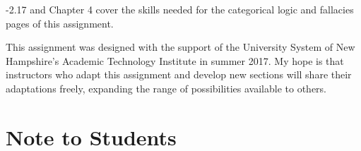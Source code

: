 \documentclass[oneside, openany]{book} %
\begin{document}
-2.17 and Chapter 4 cover the skills needed for the categorical logic and fallacies pages of this assignment.
 
This assignment was designed with  the support of the University System of New  Hampshire's Academic Technology Institute in summer 2017.  My hope  is that  instructors who  adapt this assignment and develop new sections will share their adaptations freely, expanding the range of possibilities available to others.


\chapter{Note to Students}

%
%
%
%
%
%
%
%
%
%
%
%
%
%
%
\end{document}
